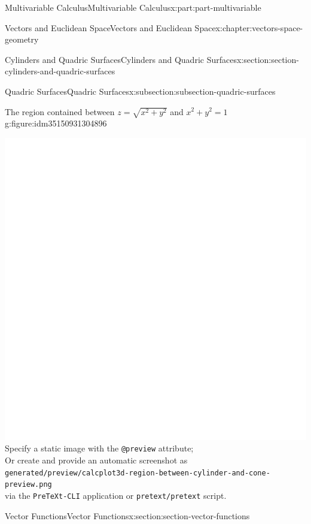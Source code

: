 \documentclass[twoside,10pt,]{book}
\newcommand{\mono}[1]{\texttt{#1}}
\numberwithin{equation}{part}
\newlength{\qrsize}
\newlength{\previewwidth}
\begin{document}
\begin{partptx}{Multivariable Calculus}{}{Multivariable Calculus}{}{}{x:part:part-multivariable}
\begin{chapterptx}{Vectors and Euclidean Space}{}{Vectors and Euclidean Space}{}{}{x:chapter:vectors-space-geometry}
\begin{sectionptx}{Cylinders and Quadric Surfaces}{}{Cylinders and Quadric Surfaces}{}{}{x:section:section-cylinders-and-quadric-surfaces}
\begin{subsectionptx}{Quadric Surfaces}{}{Quadric Surfaces}{}{}{x:subsection:subsection-quadric-surfaces}
\begin{figureptx}{The region contained between \(z = \sqrt{x^2+y^2}\) and \(x^2+y^2=1\)}{g:figure:idm35150931304896}{}
\begin{tcbraster}[raster columns=2, raster column skip=1pt, raster halign=center, raster force size=false, raster left skip=0pt, raster right skip=0pt]
\begin{tcolorbox}[previewstyle, width=\previewwidth]
{\includegraphics[width=0.80\linewidth,height=\qrsize,keepaspectratio]{generated/preview/calcplot3d-region-between-cylinder-and-cone-preview.png}}%
{\small{}Specify a static image with the \mono{@preview} attribute;\\%
Or create and provide an automatic screenshot as\\%
\mono{generated/preview/calcplot3d-region-between-cylinder-and-cone-preview.png}\\%
via the \mono{PreTeXt-CLI} application or \mono{pretext/pretext} script.}%
\end{tcolorbox}%
\begin{tcolorbox}[qrstyle]%
{\hypersetup{urlcolor=black}}%
\end{tcolorbox}%
\end{tcbraster}%
\tcblower
\end{figureptx}%
\end{subsectionptx}
\end{sectionptx}
%
%
\typeout{************************************************}
\typeout{************************************************}
%
\begin{sectionptx}{Vector Functions}{}{Vector Functions}{}{}{x:section:section-vector-functions}
\begin{introduction}{}%

\end{introduction}
\end{sectionptx}
\end{chapterptx}
\end{partptx}
\end{document}

